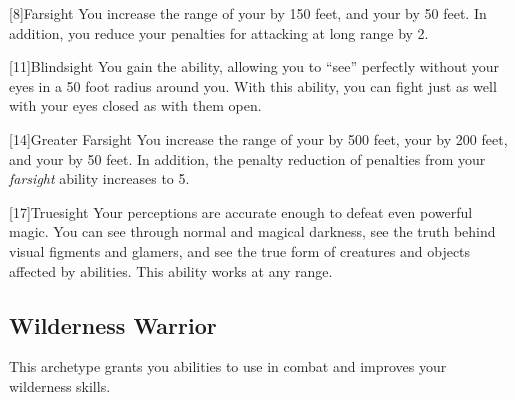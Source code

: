         [8]{Farsight}
        You increase the range of your  by 150 feet, and your  by 50 feet.
        In addition, you reduce your  penalties for attacking at long range by 2.

        [11]{Blindsight}
        You gain the  ability, allowing you to ``see'' perfectly without your eyes in a 50 foot radius around you.
        With this ability, you can fight just as well with your eyes closed as with them open.

        [14]{Greater Farsight}
        You increase the range of your  by 500 feet, your  by 200 feet, and your  by 50 feet.
        In addition, the penalty reduction of  penalties from your \textit{farsight} ability increases to 5.

        [17]{Truesight} 
        Your perceptions are accurate enough to defeat even powerful magic.
        You can see through normal and magical darkness, see the truth behind visual figments and glamers, and see the true form of creatures and objects affected by  abilities.
        This ability works at any range.

    \subsection{Wilderness Warrior}
        This archetype grants you abilities to use in combat and improves your wilderness skills.

